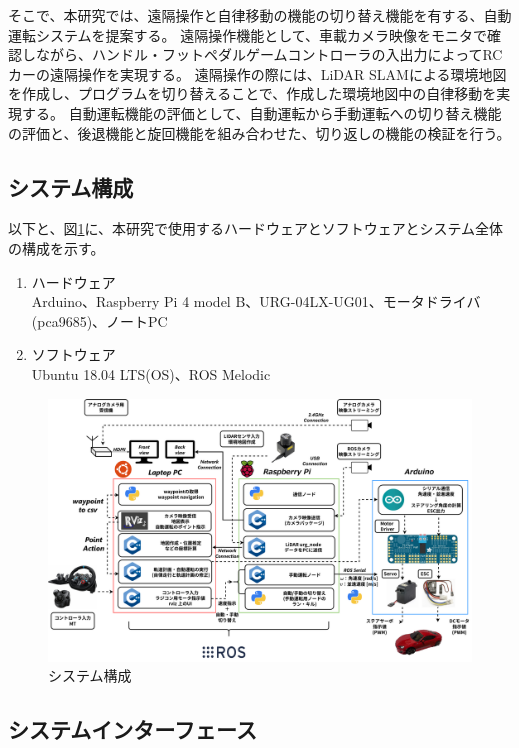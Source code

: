 そこで、本研究では、遠隔操作と自律移動の機能の切り替え機能を有する、自動運転システムを提案する。
遠隔操作機能として、車載カメラ映像をモニタで確認しながら、ハンドル・フットペダルゲームコントローラの入出力によってRCカーの遠隔操作を実現する。
遠隔操作の際には、LiDAR SLAMによる環境地図を作成し、プログラムを切り替えることで、作成した環境地図中の自律移動を実現する。
自動運転機能の評価として、自動運転から手動運転への切り替え機能の評価と、後退機能と旋回機能を組み合わせた、切り返しの機能の検証を行う。

\subsection{システム構成}
以下と、図\ref{auto:system}に、本研究で使用するハードウェアとソフトウェアとシステム全体の構成を示す。
\begin{enumerate}
  \item ハードウェア\\
  Arduino、Raspberry Pi 4 model B、URG-04LX-UG01、モータドライバ(pca9685)、ノートPC
  \item ソフトウェア\\
  Ubuntu 18.04 LTS(OS)、ROS Melodic
\end{enumerate}

\begin{figure}[h]
  \begin{center}
  \includegraphics[width=\linewidth]{img/auto_2.pdf}
  \caption{システム構成}
  \label{auto:system}
  \end{center}
\end{figure}

\subsection{システムインターフェース}
